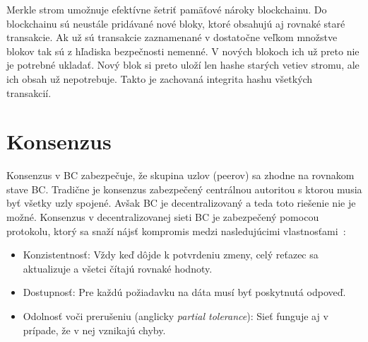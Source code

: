 Merkle strom umožnuje efektívne šetriť pamäťové nároky blockchainu. Do blockchainu sú neustále pridávané nové bloky, ktoré obsahujú aj rovnaké staré transakcie. Ak už sú transakcie zaznamenané v dostatočne veľkom množstve blokov tak sú z hľadiska bezpečnosti nemenné. V nových blokoch ich už preto nie je potrebné ukladať. Nový blok si preto uloží len hashe starých vetiev stromu, ale ich obsah už nepotrebuje. Takto je zachovaná integrita hashu všetkých transakcií.~\cite{satoshiBitcoin}


\chapter{Konsenzus}\label{chap:consenzus}

Konsenzus v BC zabezpečuje, že skupina uzlov (peerov) sa  zhodne na rovnakom stave BC. Tradične je konsenzus zabezpečený centrálnou autoritou s ktorou musia byť všetky uzly spojené. Avšak BC je decentralizovaný a teda toto riešenie nie je možné. Konsenzus v decentralizovanej sieti BC je zabezpečený pomocou protokolu, ktorý sa snaží nájsť kompromis medzi nasledujúcimi vlastnosťami~\cite{gilbertCAP, zhangConsensus, leporeConsensus}:
\begin{itemize}
	\item Konzistentnosť: Vždy keď dôjde k potvrdeniu zmeny, celý reťazec sa aktualizuje a všetci čítajú rovnaké hodnoty.
	\item Dostupnosť: Pre každú požiadavku na dáta musí byť poskytnutá odpoveď.
	\item Odolnosť voči prerušeniu (anglicky \textit{partial tolerance}): Sieť funguje aj v prípade, že v nej vznikajú chyby.
\end{itemize}


